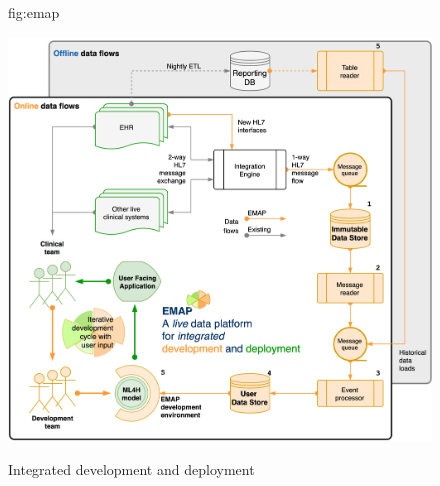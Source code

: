 \documentclass[pmlr,twocolumn,10pt]{jmlr} %
\begin{document}
\begin{figure}[htbp]

\floatconts
  {fig:emap}
  {\caption{Integrated development and deployment}}
  {\includegraphics[width=1.0\linewidth]{images/emap-summary-emap-summary.png}}
\end{figure}
\end{document}
